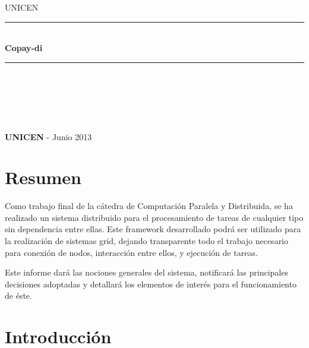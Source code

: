 \documentclass[12pt,a4paper,oneside,spanish]{report}
\newcommand{\HRule}{\rule{\linewidth}{0.5mm}}
\begin{document}
\begin{titlepage}
\begin{center}


\textsc{\LARGE UNICEN}\\[1.5cm]



\HRule \\[0.4cm]
{ \huge \bfseries Copay-di}\\[0.4cm]

\HRule \\[0.4cm]


\begin{center}
\textbf{}
\end{center}
~\\[3.5cm]


\textit{}


~\\[0.4cm]
\textit{} \textbf{} 

\vfill

{\large \textbf{UNICEN} - Junio 2013}

\end{center}
\end{titlepage}

\chapter*{Resumen}

Como trabajo final de la cátedra de Computación Paralela y Distribuida, se ha realizado un sistema distribuido para el procesamiento de tareas de cualquier tipo sin dependencia entre ellas. Este framework desarrollado podrá ser utilizado para la realización de sistemas grid, dejando transparente todo el trabajo necesario para conexión de nodos, interacción entre ellos, y ejecución de tareas.

Este informe dará las nociones generales del sistema, notificará las principales decisiones adoptadas y detallará los elementos de interés para el funcionamiento de éste.



\chapter*{Introducción}
\end{document}
